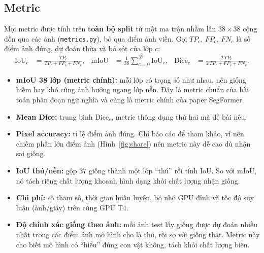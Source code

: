 \documentclass[12pt]{article}
\newcommand{\code}[1]{\texttt{#1}}
\newcommand{\st}[1]{\textbf{#1}}
\begin{document}
\subsection{Metric}\label{sec:metrics}
Mọi metric được tính trên \st{toàn bộ split} từ một ma trận nhầm lẫn $38\times38$ cộng dồn qua các ảnh (\code{metrics.py}),
bỏ qua điểm ảnh viền. Gọi $TP_c$, $FP_c$, $FN_c$ là số điểm ảnh đúng, dự đoán thừa và bỏ sót của lớp $c$:
\begin{align*}
\mathrm{IoU}_c &= \frac{TP_c}{TP_c + FP_c + FN_c}, &
\mathrm{mIoU} &= \frac{1}{38}\sum_{c=0}^{37}\mathrm{IoU}_c, &
\mathrm{Dice}_c &= \frac{2\,TP_c}{2\,TP_c + FP_c + FN_c}.
\end{align*}
\begin{itemize}
  \item \st{mIoU 38 lớp (metric chính):} mỗi lớp có trọng số như nhau, nên giống hiếm hay khó cũng ảnh hưởng ngang lớp nền.
        Đây là metric chuẩn của bài toán phân đoạn ngữ nghĩa và cũng là metric chính của paper SegFormer.
  \item \st{Mean Dice:} trung bình $\mathrm{Dice}_c$, metric thông dụng thứ hai mà đề bài nêu.
  \item \st{Pixel accuracy:} tỉ lệ điểm ảnh đúng. Chỉ báo cáo để tham khảo, vì nền chiếm phần lớn điểm ảnh (Hình~\ref{fig:share})
        nên metric này dễ cao dù nhận sai giống.
  \item \st{IoU thú/nền:} gộp 37 giống thành một lớp ``thú'' rồi tính IoU. So với mIoU, nó tách riêng chất lượng khoanh hình
        dạng khỏi chất lượng nhận giống.
  \item \st{Chi phí:} số tham số, thời gian huấn luyện, bộ nhớ GPU đỉnh và tốc độ suy luận (ảnh/giây) trên cùng GPU T4.
  \item \st{Độ chính xác giống theo ảnh:} mỗi ảnh test lấy giống được dự đoán nhiều nhất trong các điểm ảnh mô hình cho là
        thú, rồi so với giống thật. Metric này cho biết mô hình có ``hiểu'' đúng con vật không, tách khỏi chất lượng biên.
\end{itemize}
\end{document}
